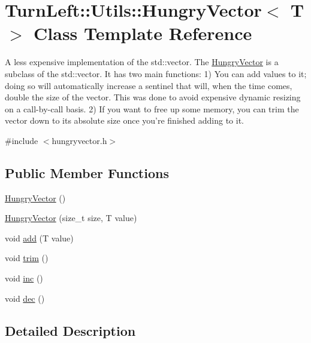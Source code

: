\hypertarget{classTurnLeft_1_1Utils_1_1HungryVector}{
\section{TurnLeft::Utils::HungryVector$<$ T $>$ Class Template Reference}
\label{classTurnLeft_1_1Utils_1_1HungryVector}
}


A less expensive implementation of the std::vector. The \hyperlink{classTurnLeft_1_1Utils_1_1HungryVector}{HungryVector} is a subclass of the std::vector. It has two main functions: 1) You can add values to it; doing so will automatically increase a sentinel that will, when the time comes, double the size of the vector. This was done to avoid expensive dynamic resizing on a call-\/by-\/call basis. 2) If you want to free up some memory, you can trim the vector down to its absolute size once you're finished adding to it.  




{\ttfamily \#include $<$hungryvector.h$>$}

\subsection*{Public Member Functions}
\begin{DoxyCompactItemize}
\item 
\hyperlink{classTurnLeft_1_1Utils_1_1HungryVector_a3f92da70d31c708265ea772783e5453a}{HungryVector} ()
\item 
\hyperlink{classTurnLeft_1_1Utils_1_1HungryVector_a07d3be21e184f8f80cde62d4303fb1d3}{HungryVector} (size\_\-t size, T value)
\item 
void \hyperlink{classTurnLeft_1_1Utils_1_1HungryVector_a9eeefa75b26da7317c0e22929e729464}{add} (T value)
\item 
void \hyperlink{classTurnLeft_1_1Utils_1_1HungryVector_a1f47546497d946f2c5a988f242e4863f}{trim} ()
\item 
void \hyperlink{classTurnLeft_1_1Utils_1_1HungryVector_ade6e0a3c8b5524e487a0c724606d130d}{inc} ()
\item 
void \hyperlink{classTurnLeft_1_1Utils_1_1HungryVector_adf7287a513b121b56f543c6826a4216e}{dec} ()
\end{DoxyCompactItemize}


\subsection{Detailed Description}
